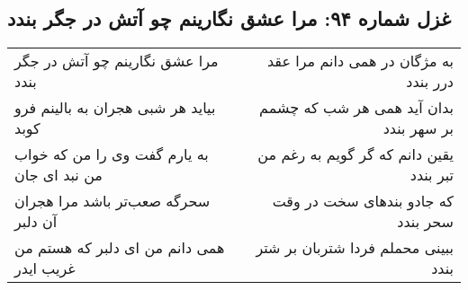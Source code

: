\begin{center}
\section*{غزل شماره ۹۴: مرا عشق نگارینم چو آتش در جگر بندد}
\label{sec:094}
\begin{longtable}{l p{0.5cm} r}
مرا عشق نگارینم چو آتش در جگر بندد
&&
به مژگان در همی دانم مرا عقد درر بندد
\\
بیاید هر شبی هجران به بالینم فرو کوبد
&&
بدان آید همی هر شب که چشمم بر سهر بندد
\\
به یارم گفت وی را من که خواب من نبد ای جان
&&
یقین دانم که گر گویم به رغم من تبر بندد
\\
سحرگه صعب‌تر باشد مرا هجران آن دلبر
&&
که جادو بندهای سخت در وقت سحر بندد
\\
همی دانم من ای دلبر که هستم من غریب ایدر
&&
ببینی محملم فردا شتربان بر شتر بندد
\\
\end{longtable}
\end{center}
